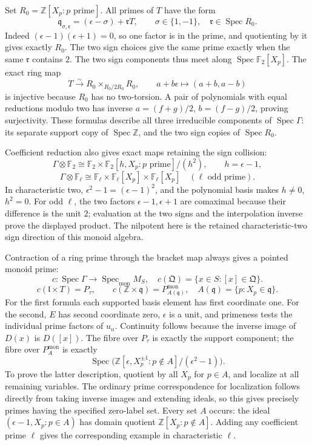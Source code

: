 \documentclass[
  10pt,
]{article}
\begin{document}
Set \(R_0=\mathbb Z[X_p:p\text{ prime}]\). All primes of \(T\) have the
form \[
\mathfrak q_{\sigma,\mathfrak r}=(\epsilon-\sigma)+\mathfrak rT,
\qquad \sigma\in\{1,-1\},\quad\mathfrak r\in\operatorname{Spec}R_0.
\tag{TPS38}
\] Indeed \((\epsilon-1)(\epsilon+1)=0\), so one factor is in the prime,
and quotienting by it gives exactly \(R_0\). The two sign choices give
the same prime exactly when the same \(\mathfrak r\) contains \(2\). The
two sign components thus meet along
\(\operatorname{Spec}\mathbb F_2[X_p]\). The exact ring map \[
T\xrightarrow{\sim}R_0\times_{R_0/2R_0}R_0,
\qquad a+b\epsilon\mapsto(a+b,a-b)
\tag{TPS39}
\] is injective because \(R_0\) has no two-torsion. A pair of
polynomials with equal reductions modulo two has inverse \(a=(f+g)/2\),
\(b=(f-g)/2\), proving surjectivity. These formulas describe all three
irreducible components of \(\operatorname{Spec}\Gamma\): its separate
support copy of \(\operatorname{Spec}\mathbb Z\), and the two sign
copies of \(\operatorname{Spec}R_0\).

Coefficient reduction also gives exact maps retaining the sign
collision: \[
\Gamma\otimes\mathbb F_2\cong
\mathbb F_2\times\mathbb F_2[h,X_p:p\text{ prime}]/(h^2),\qquad h=\epsilon-1,
\] \[
\Gamma\otimes\mathbb F_\ell\cong
\mathbb F_\ell\times\mathbb F_\ell[X_p]\times\mathbb F_\ell[X_p]
\quad(\ell\text{ odd prime}).
\tag{TPS40}
\] In characteristic two, \(\epsilon^2-1=(\epsilon-1)^2\), and the
polynomial basis makes \(h\ne0\), \(h^2=0\). For odd \(\ell\), the two
factors \(\epsilon-1,\epsilon+1\) are comaximal because their difference
is the unit \(2\); evaluation at the two signs and the interpolation
inverse prove the displayed product. The nilpotent here is the retained
characteristic-two sign direction of this monoid algebra.

Contraction of a ring prime through the bracket map always gives a
pointed monoid prime: \[
c:\operatorname{Spec}\Gamma\to\operatorname{Spec}_{\mathrm{mon}}M_S,
\quad c(\mathfrak Q)=\{x\in S:[x]\in\mathfrak Q\}.
\] \[
\boxed{c(\mathfrak l\times T)=P_\tau,\qquad
c(\mathbb Z\times\mathfrak q)=P_{A(\mathfrak q)}^{\mathrm{mon}},
\quad A(\mathfrak q)=\{p:X_p\in\mathfrak q\}.}
\tag{TPS41}
\] For the first formula each supported basis element has first
coordinate one. For the second, \(E\) has second coordinate zero,
\(\epsilon\) is a unit, and primeness tests the individual prime factors
of \(u_n\). Continuity follows because the inverse image of \(D(x)\) is
\(D([x])\). The fibre over \(P_\tau\) is exactly the support component;
the fibre over \(P_A^{\mathrm{mon}}\) is exactly \[
\operatorname{Spec}\bigl(\mathbb Z[\epsilon,X_p^{\pm1}:p\notin A]/(\epsilon^2-1)\bigr).
\tag{TPS42}
\] To prove the latter description, quotient by all \(X_p\) for
\(p\in A\), and localize at all remaining variables. The ordinary prime
correspondence for localization follows directly from taking inverse
images and extending ideals, so this gives precisely primes having the
specified zero-label set. Every set \(A\) occurs: the ideal
\((\epsilon-1,X_p:p\in A)\) has domain quotient
\(\mathbb Z[X_p:p\notin A]\). Adding any coefficient prime \(\ell\)
gives the corresponding example in characteristic \(\ell\).
\end{document}

